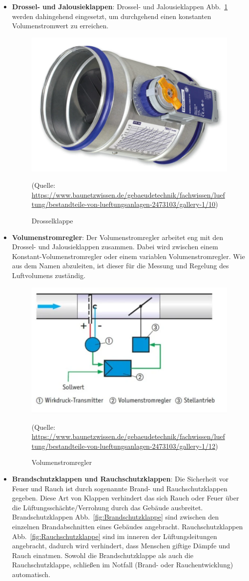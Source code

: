 \begin{itemize}
	\item \textbf{Drossel- und Jalousieklappen}: 
	Drossel- und Jalousieklappen Abb.~\ref{fig:drosselklappe} werden dahingehend eingesetzt, um durchgehend einen konstanten Volumenstromwert zu erreichen. 
	
	\begin{figure}[H]
		\centering
		\includegraphics[width=0.5\linewidth]{Bilder/drosselklappe}
		\caption{Drosselklappe} 
		(Quelle: \url{	https://www.baunetzwissen.de/gebaeudetechnik/fachwissen/lueftung/bestandteile-von-lueftungsanlagen-2473103/gallery-1/10})
		\label{fig:drosselklappe}
	\end{figure}
	
	\item \textbf{Volumenstromregler}: Der Volumenstromregler arbeitet eng mit den Drossel- und Jalousieklappen zusammen. Dabei wird zwischen einem Konstant-Volumenstromregler oder einem variablen Volumenstromregler. Wie aus dem Namen abzuleiten, ist dieser für die Messung und Regelung des Luftvolumens zuständig. 
	
	\begin{figure}[H]
		\centering
		\includegraphics[width=0.5\linewidth]{Bilder/volumenstromregler}
		\caption{Volumenstromregler} 
		(Quelle: \url{	https://www.baunetzwissen.de/gebaeudetechnik/fachwissen/lueftung/bestandteile-von-lueftungsanlagen-2473103/gallery-1/12})
		\label{fig:volumenstromregler}
	\end{figure}
	
	\item \textbf{Brandschutzklappen und Rauchschutzklappen}:
	Die Sicherheit vor Feuer und Rauch ist durch sogenannte Brand- und Rauchschutzklappen gegeben.
	Diese Art von Klappen verhindert das sich Rauch oder Feuer über die Lüftungsschächte/Verrohung durch das Gebäude ausbreitet. Brandschutzklappen Abb.~\ref{fig:Brandschutzklappe} sind zwischen den einzelnen Brandabschnitten eines Gebäudes angebracht. Rauchschutzklappen Abb.~\ref{fig:Rauchschutzklappe} sind im inneren der Lüftungsleitungen angebracht, dadurch wird verhindert, dass Menschen giftige Dämpfe und Rauch einatmen. Sowohl die Brandschutzklappe als auch die Rauchschutzklappe, schließen im Notfall (Brand- oder Rauchentwicklung) automatisch.
\end{itemize}

